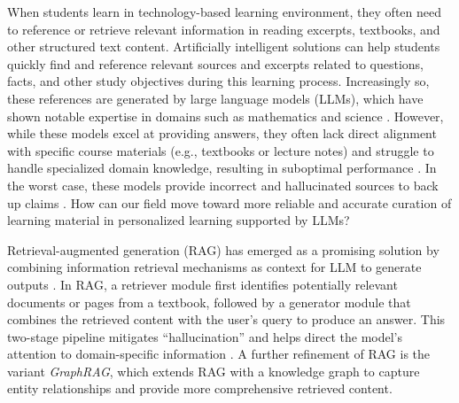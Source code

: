 \documentclass[runningheads]{llncs}
\begin{document}
When students learn in technology-based learning environment, they often need to reference or retrieve relevant information in reading excerpts, textbooks, and other structured text content. Artificially intelligent solutions can help students quickly find and reference relevant sources and excerpts related to questions, facts, and other study objectives during this learning process. Increasingly so, these references are generated by large language models (LLMs), which have shown notable expertise in domains such as mathematics and science \cite{brown2020language,openai2024gpt4technicalreport}. However, while these models excel at providing answers, they often lack direct alignment with specific course materials (e.g., textbooks or lecture notes) and struggle to handle specialized domain knowledge, resulting in suboptimal performance \cite{chen2024systematic,moore2022assessing,nguyen2023evaluating}. In the worst case, these models provide incorrect and hallucinated sources to back up claims \cite{ji2023survey}. How can our field move toward more reliable and accurate curation of learning material in personalized learning supported by LLMs?

Retrieval-augmented generation (RAG) has emerged as a promising solution by combining information retrieval mechanisms as context for LLM to generate outputs \cite{wang2024largelanguagemodelseducation,gao2024retrievalaugmentedgenerationlargelanguage,chen2024systematic}. In RAG, a retriever module first identifies potentially relevant documents or pages from a textbook, followed by a generator module that combines the retrieved content with the user’s query to produce an answer. This two-stage pipeline mitigates ``hallucination'' and helps direct the model’s attention to domain-specific information \cite{han2024improving}. A further refinement of RAG is the variant \textit{GraphRAG}\cite{edge2024localglobalgraphrag}, which extends RAG with a knowledge graph to capture entity relationships and provide more comprehensive retrieved content.
\end{document}
